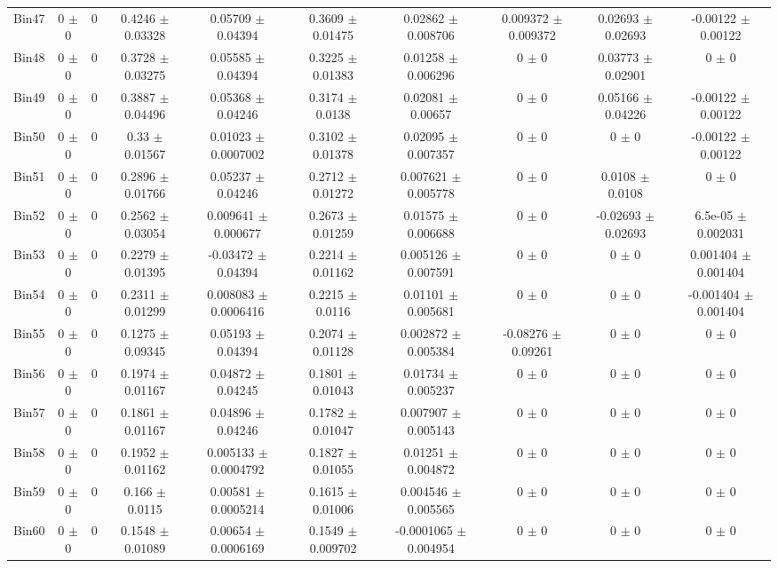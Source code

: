 \begin{tabular}{@{\extracolsep{4pt}}lccccccccc@{}}
     Bin47 & 0 $\pm$ 0 & 0 & 0.4246 $\pm$ 0.03328 & 0.05709 $\pm$ 0.04394 & 0.3609 $\pm$ 0.01475 & 0.02862 $\pm$ 0.008706 & 0.009372 $\pm$ 0.009372 & 0.02693 $\pm$ 0.02693 & -0.00122 $\pm$ 0.00122 \\ 
     Bin48 & 0 $\pm$ 0 & 0 & 0.3728 $\pm$ 0.03275 & 0.05585 $\pm$ 0.04394 & 0.3225 $\pm$ 0.01383 & 0.01258 $\pm$ 0.006296 & 0 $\pm$ 0 & 0.03773 $\pm$ 0.02901 & 0 $\pm$ 0 \\ 
     Bin49 & 0 $\pm$ 0 & 0 & 0.3887 $\pm$ 0.04496 & 0.05368 $\pm$ 0.04246 & 0.3174 $\pm$ 0.0138 & 0.02081 $\pm$ 0.00657 & 0 $\pm$ 0 & 0.05166 $\pm$ 0.04226 & -0.00122 $\pm$ 0.00122 \\ 
     Bin50 & 0 $\pm$ 0 & 0 & 0.33 $\pm$ 0.01567 & 0.01023 $\pm$ 0.0007002 & 0.3102 $\pm$ 0.01378 & 0.02095 $\pm$ 0.007357 & 0 $\pm$ 0 & 0 $\pm$ 0 & -0.00122 $\pm$ 0.00122 \\ 
     Bin51 & 0 $\pm$ 0 & 0 & 0.2896 $\pm$ 0.01766 & 0.05237 $\pm$ 0.04246 & 0.2712 $\pm$ 0.01272 & 0.007621 $\pm$ 0.005778 & 0 $\pm$ 0 & 0.0108 $\pm$ 0.0108 & 0 $\pm$ 0 \\ 
     Bin52 & 0 $\pm$ 0 & 0 & 0.2562 $\pm$ 0.03054 & 0.009641 $\pm$ 0.000677 & 0.2673 $\pm$ 0.01259 & 0.01575 $\pm$ 0.006688 & 0 $\pm$ 0 & -0.02693 $\pm$ 0.02693 & 6.5e-05 $\pm$ 0.002031 \\ 
     Bin53 & 0 $\pm$ 0 & 0 & 0.2279 $\pm$ 0.01395 & -0.03472 $\pm$ 0.04394 & 0.2214 $\pm$ 0.01162 & 0.005126 $\pm$ 0.007591 & 0 $\pm$ 0 & 0 $\pm$ 0 & 0.001404 $\pm$ 0.001404 \\ 
     Bin54 & 0 $\pm$ 0 & 0 & 0.2311 $\pm$ 0.01299 & 0.008083 $\pm$ 0.0006416 & 0.2215 $\pm$ 0.0116 & 0.01101 $\pm$ 0.005681 & 0 $\pm$ 0 & 0 $\pm$ 0 & -0.001404 $\pm$ 0.001404 \\ 
     Bin55 & 0 $\pm$ 0 & 0 & 0.1275 $\pm$ 0.09345 & 0.05193 $\pm$ 0.04394 & 0.2074 $\pm$ 0.01128 & 0.002872 $\pm$ 0.005384 & -0.08276 $\pm$ 0.09261 & 0 $\pm$ 0 & 0 $\pm$ 0 \\ 
     Bin56 & 0 $\pm$ 0 & 0 & 0.1974 $\pm$ 0.01167 & 0.04872 $\pm$ 0.04245 & 0.1801 $\pm$ 0.01043 & 0.01734 $\pm$ 0.005237 & 0 $\pm$ 0 & 0 $\pm$ 0 & 0 $\pm$ 0 \\ 
     Bin57 & 0 $\pm$ 0 & 0 & 0.1861 $\pm$ 0.01167 & 0.04896 $\pm$ 0.04246 & 0.1782 $\pm$ 0.01047 & 0.007907 $\pm$ 0.005143 & 0 $\pm$ 0 & 0 $\pm$ 0 & 0 $\pm$ 0 \\ 
     Bin58 & 0 $\pm$ 0 & 0 & 0.1952 $\pm$ 0.01162 & 0.005133 $\pm$ 0.0004792 & 0.1827 $\pm$ 0.01055 & 0.01251 $\pm$ 0.004872 & 0 $\pm$ 0 & 0 $\pm$ 0 & 0 $\pm$ 0 \\ 
     Bin59 & 0 $\pm$ 0 & 0 & 0.166 $\pm$ 0.0115 & 0.00581 $\pm$ 0.0005214 & 0.1615 $\pm$ 0.01006 & 0.004546 $\pm$ 0.005565 & 0 $\pm$ 0 & 0 $\pm$ 0 & 0 $\pm$ 0 \\ 
     Bin60 & 0 $\pm$ 0 & 0 & 0.1548 $\pm$ 0.01089 & 0.00654 $\pm$ 0.0006169 & 0.1549 $\pm$ 0.009702 & -0.0001065 $\pm$ 0.004954 & 0 $\pm$ 0 & 0 $\pm$ 0 & 0 $\pm$ 0 \\ 
\hline\hline
  \end{tabular}

